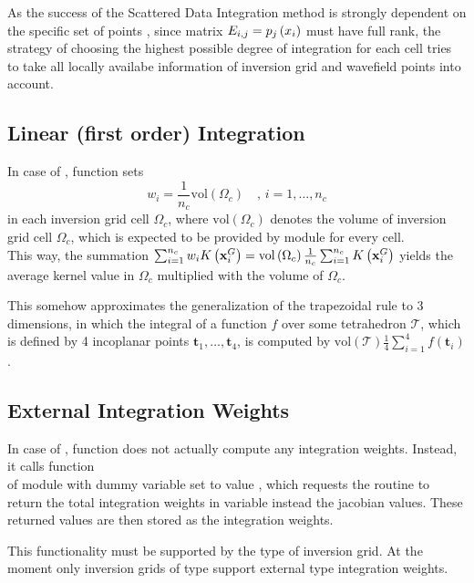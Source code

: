 As the success of the Scattered Data Integration method is strongly dependent on the specific set of 
points \wpS, since matrix $E_{i,j} = p_j\left( x_i \right)$ must have full rank, the strategy of choosing 
the highest possible degree of integration for each cell tries to take all locally availabe information 
of inversion grid and wavefield points into account.
%
\subsection{Linear (first order) Integration} \label{programs_scripts,sec:fmod_intw,sec:linear}
%
In case of , function  sets 
\[w_i = \frac{1}{n_c}\mathrm{vol}\left(\Omega_c\right) \quad ,\, i=1,\dots,n_c\]
in each inversion grid cell $\Omega_c$, where $\mathrm{vol}\left(\Omega_c\right)$ denotes the 
volume of inversion grid cell $\Omega_c$, which is expected to be provided by module 
for every cell.\\
This way, the summation $\sum_{i=1}^{n_c} w_iK\left( \mathbf{x}_i^G \right) = 
\mathrm{vol}\left(\Omega_c\right)\frac{1}{n_c} \sum_{i=1}^{n_c} K\left( \mathbf{x}_i^G \right)$ yields 
the average kernel value in $\Omega_c$ multiplied with the volume of $\Omega_c$.

This somehow approximates the generalization of the trapezoidal rule to 3 dimensions, in which the 
integral of a function $f$ over some tetrahedron $\mathcal{T}$, which is defined by 4 incoplanar points 
$\mathbf{t}_1,\dots,\mathbf{t}_4$, is computed by $\mathrm{vol}\left(\mathcal{T}\right)\frac{1}{4} 
\sum_{i=1}^4 f(\mathbf{t}_i)$. 
%
\subsection{External Integration Weights} \label{programs_scripts,sec:fmod_intw,sec:external}
%
In case of , function  does not actually compute
any integration weights. Instead, it calls function \\
 of module 
 with dummy variable  set to value , which 
requests the routine to return the total integration weights in variable  instead the 
jacobian values. These returned values are then stored as the integration weights.

This functionality must be supported by the type of inversion grid. At the moment only inversion grids 
of type  support external type integration weights.
%      
